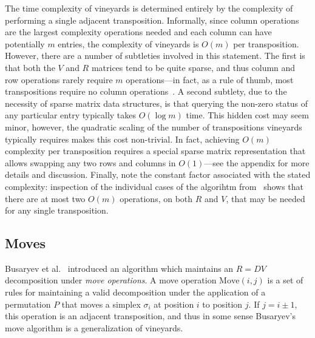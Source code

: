 \documentclass{article} %
\begin{document}
 The time complexity of vineyards is determined entirely by the complexity of performing a single adjacent transposition.
 Informally, since column operations are the largest complexity operations needed and each column can have potentially $m$ entries, the complexity of vineyards is $O(m)$ per transposition. 
 However, there are a number of subtleties involved in this statement. 
 The first  is that both the $V$ and $R$ matrices tend to be quite sparse, and thus column and row operations rarely require $m$ operations---in fact, as a rule of thumb, most transpositions require no column operations~\cite{edelsbrunner2000topological}. A second subtlety, due to the necessity of sparse matrix data structures, is that querying the non-zero status of any particular entry typically takes $O(\log m)$ time. This hidden cost may seem minor, however, the quadratic scaling of the number of transpositions vineyards typically requires makes this cost non-trivial.   
In fact, achieving $O(m)$ complexity per transposition requires a special sparse matrix representation that allows swapping any two rows and columns in $O(1)$---see the appendix for more details and discussion. Finally, note the constant factor associated with the stated complexity: inspection of the individual cases of the algorihtm from~\cite{cohen2006vines} shows that there are at most two $O(m)$ operations, on both $R$ and $V$, that may be needed for any single transposition.
 

\subsection{Moves}\label{sec:moves} Busaryev et al.~\cite{busaryev2010tracking} introduced an algorithm which maintains an $R = D V$ decomposition under \emph{move operations}. A move operation $\mathrm{Move}(i,j)$ is a set of rules for maintaining a valid decomposition under the application of a permutation $P$ that moves a simplex $\sigma_i$ at position $i$ to position $j$. If $j = i \pm 1$, this operation is an adjacent transposition, and thus in some sense Busaryev's move algorithm is a generalization of  vineyards.
\end{document}
